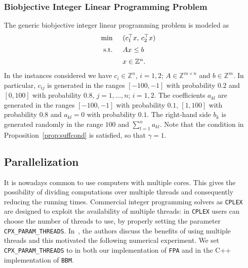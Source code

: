 \documentclass[preprint,12pt]{elsarticle}
\def\Z{\mathbb{Z}}
\begin{document}
\subsubsection{Biobjective Integer Linear Programming Problem}\label{sec:num-lp}
The generic biobjective integer linear programming problem is modeled as
\begin{equation*}\label{BOILP}
\begin{array}{l l}
    \min & (c_1^\top x,\, c_2^\top x)\\[1.2ex]
    \textnormal{ s.t. }&  A x \leq b\\[1.2ex]
    & x\in\Z^n.
  \end{array}
 \end{equation*}
In the instances considered we have $c_i\in \Z^n$, $i=1,2$;\; $A\in \Z^{m\times n}$ and $b\in \Z^m$.
In particular, $c_{ij}$ is generated in the ranges $[-100,-1]$ with probability $0.2$ and $[0,100]$ with probability $0.8$,
$j=1,\ldots,n$; $i=1,2$. The coefficients $a_{kl}$ are generated in the ranges $[-100,-1]$ with probability $0.1$,
$[1,100]$ with probability $0.8$ and $a_{kl}=0$ with probability $0.1$.
The right-hand side $b_k$ is generated randomly in the range $100$ and $\sum_{l=1}^n a_{kl}$.
Note that the condition in Proposition~\ref{prop:suffcond} is satisfied, so that $\gamma=1$.



\subsection{Parallelization}
It is nowadays common to use computers with multiple cores.
This gives the possibility of dividing computations over multiple threads
and consequently reducing the running times. Commercial integer programming solvers as
\texttt{CPLEX} are designed
to exploit the availability of multiple threads: in \texttt{CPLEX} users can choose the number
of threads to use, by properly setting the parameter \texttt{CPX\_PARAM\_THREADS}.
In~\cite{boland2015criterion}, the authors discuss the benefits of using multiple threads
and this motivated the following numerical experiment.
We set \texttt{CPX\_PARAM\_THREADS} to  in both our implementation of
\texttt{FPA} and in the C++ implementation of \texttt{BBM}.
\end{document}
